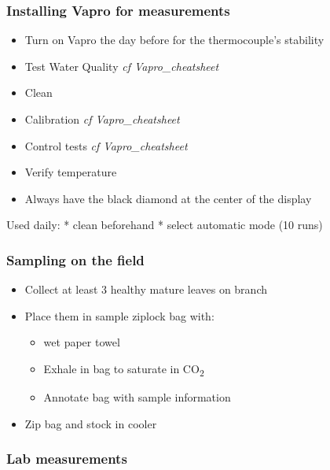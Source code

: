 \documentclass[
  12pt,
  american,
  a4paper,
  extrafontsizes,onecolumn,openright
  ]{memoir}
\providecommand{\tightlist}{%
  \setlength{\itemsep}{0pt}\setlength{\parskip}{0pt}}
\begin{document}
\hypertarget{installing-vapro-for-measurements}{%
\subsubsection{Installing Vapro for measurements}\label{installing-vapro-for-measurements}}

\begin{itemize}
\tightlist
\item
  Turn on Vapro the day before for the thermocouple's stability
\item
  Test Water Quality \emph{cf Vapro\_cheatsheet}
\item
  Clean
\item
  Calibration \emph{cf Vapro\_cheatsheet}
\item
  Control tests \emph{cf Vapro\_cheatsheet}
\item
  Verify temperature
\item
  Always have the black diamond at the center of the display
\end{itemize}

Used daily:
* clean beforehand
* select automatic mode (10 runs)

\hypertarget{sampling-on-the-field}{%
\subsubsection{Sampling on the field}\label{sampling-on-the-field}}

\begin{itemize}
\tightlist
\item
  Collect at least 3 healthy mature leaves on branch
\item
  Place them in sample ziplock bag with:

  \begin{itemize}
  \tightlist
  \item
    wet paper towel
  \item
    Exhale in bag to saturate in CO\textsubscript{2}
  \item
    Annotate bag with sample information
  \end{itemize}
\item
  Zip bag and stock in cooler
\end{itemize}

\hypertarget{lab-measurements}{%
\subsubsection{Lab measurements}\label{lab-measurements}}
\end{document}
